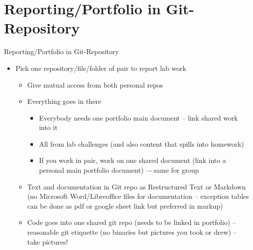 ﻿\section{Reporting/Portfolio in Git-Repository}

\begin{frame}{Reporting/Portfolio in Git-Repository}
\begin{itemize}
    \item Pick one \alert{repository/file/folder of pair} to report lab work
\begin{itemize}
    \item Give \alert{mutual access} from both personal repos
    \item Everything goes in there
\begin{itemize}
    \item \alert{Everybody} needs one \alert{portfolio main document} – link shared work into it
    \item All from lab challenges (and also content that spills into homework)
    \item If you work in pair, work on one shared document (link into a personal main portfolio document) –- same for group
\end{itemize}
\item Text and documentation in Git repo as \alert{Restructured Text or Markdown} (no Microsoft Word/Libreoffice files for documentation – exception tables can be done as pdf or google sheet link but preferred in markup)
\item \alert{Code} goes into one \alert{shared git repo} (needs to be linked in portfolio) -- reasonable git etiquette (no binaries but pictures you took or drew) -- take pictures!
\end{itemize}
\end{itemize}
\end{frame}
